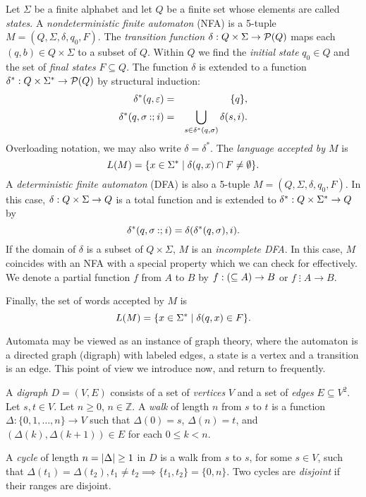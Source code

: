 		\begin{definition}\label{def:NFA}
			Let $\Sigma$ be a finite alphabet and let $Q$ be a finite set whose elements are called \emph{states}.
			A \emph{nondeterministic finite automaton} (NFA) is a 5-tuple
			\(
				M=(Q,\Sigma,\delta,q_0,F).
			\)
			The \emph{transition function} $\delta: Q\times\Sigma\to\mathcal P(Q)$ maps each $(q,b)\in Q\times\Sigma$ to a subset of $Q$.
			Within $Q$ we find the \emph{initial state} $q_0\in Q$ and
			the set of \emph{final states} $F\subseteq Q$.
			The function $\delta$ is extended to a function $\delta^*: Q\times\Sigma^*\to\mathcal P(Q)$ by
			structural induction:
			\begin{eqnarray*}
				\delta^*(q,\varepsilon) &=& \{q\},\\
				\delta^*(q,\sigma\mathbin{{:}{;}} i)&=&\bigcup_{s\in \delta^*(q,\sigma)}\delta(s,i).
			\end{eqnarray*}
			Overloading notation, we may also write $\delta=\delta^*$.
			The \emph{language accepted by $M$} is
			\[
				L(M)=\{x \in \Sigma^*\mid  \delta(q,x)\cap F\ne\emptyset\}.
			\]
			A \emph{deterministic finite automaton} (DFA) is also a 5-tuple
			\(
				M=(Q,\Sigma,\delta,q_0,F).
			\)
			In this case, $\delta: Q\times\Sigma\to Q$ is a total function and is extended to $\delta^*: Q\times\Sigma^*\to Q$ by
			\begin{equation}\label{eq:recursion}
			\delta^*(q,\sigma \mathbin{{:}{;}} i)=\delta(\delta^*(q,\sigma),i).
			\end{equation}
			If the domain of $\delta$ is a subset of $Q\times\Sigma$, $M$ is an \emph{incomplete DFA}.
			In this case, $M$ coincides with an NFA with a special property which we can check for effectively.
			We denote a partial function $f$ from $A$ to $B$ by $f: (\subseteq A)\to B$ or $f\mathrel{\vdots}A\to B$\index{$\vdots$}.

			Finally,
			the set of words accepted by $M$ is
			\[
				L(M)=\{x \in \Sigma^*\mid  \delta(q,x)\in F\}.
			\]
		\end{definition}

		Automata may be viewed as an instance of graph theory, where
		the automaton is a directed graph (digraph) with labeled edges, a state is a vertex and a transition is an edge.
		This point of view we introduce now, and return to frequently.


		\begin{definition}\label{df:digraph}
			A \emph{digraph} $D=(V,E)$ consists of a set of \emph{vertices} $V$ and a set of \emph{edges} $E\subseteq V^2$.
			Let $s,t\in V$.
			Let $n\ge 0$, $n\in\mathbb Z$. 
			A \emph{walk} of length $n$ from $s$ to $t$ is a function $\Delta:\{0,1,\dots,n\}\to V$
			such that $\Delta(0)=s$, $\Delta(n)=t$, and $(\Delta(k),\Delta(k+1))\in E$ for each $0\le k<n$.

			A \emph{cycle} of length $n=\lvert\Delta\rvert\ge 1$ in $D$ is a walk from $s$ to $s$, for some $s\in V$, such that
			$\Delta(t_1)=\Delta(t_2), t_1\ne t_2\implies \{t_1,t_2\}=\{0, n\}$.
			Two cycles are \emph{disjoint} if their ranges are disjoint.
		\end{definition}


